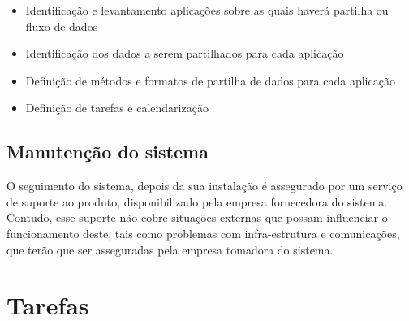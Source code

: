 \begin{itemize} 
\item Identificação e levantamento aplicações sobre as quais haverá partilha ou fluxo de dados
\item Identificação dos dados a serem partilhados para cada aplicação
\item Definição de métodos e formatos de partilha de dados para cada aplicação
\item Definição de tarefas e calendarização  
\end{itemize} 

\subsection{Manutenção do sistema}
O seguimento do sistema, depois da sua instalação é assegurado por um serviço de suporte ao produto, disponibilizado pela empresa fornecedora do sistema. Contudo, esse suporte não cobre situações externas que possam influenciar o funcionamento deste, tais como problemas com infra-estrutura e comunicações, que terão que ser asseguradas pela empresa tomadora do sistema. 

\section{Tarefas}
